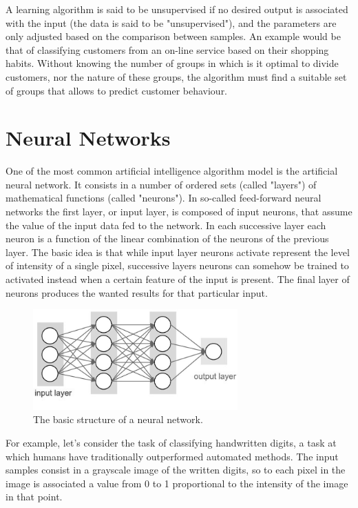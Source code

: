 \documentclass[a4paper]{report}
\begin{document}
A learning algorithm is said to be unsupervised if no desired output is associated with the input (the data is said to be "unsupervised"), and the parameters are only adjusted based on the comparison between samples.
An example would be that of classifying customers from an on-line service based on their shopping habits.
Without knowing the number of groups in which is it optimal to divide customers, nor the nature of these groups, the algorithm must find a suitable set of groups that allows to predict customer behaviour.

\section{Neural Networks}
One of the most common artificial intelligence algorithm model is the artificial neural network.
It consists in a number of ordered sets (called "layers") of mathematical functions (called "neurons").
In so-called feed-forward neural networks the first layer, or input layer, is composed of input neurons, that assume the value of the input data fed to the network.
In each successive layer each neuron is a function of the linear combination of the neurons of the previous layer.
The basic idea is that while input layer neurons activate represent the level of intensity of a single pixel, successive layers neurons can somehow be trained to activated instead when a certain feature of the input is present.
The final layer of neurons produces the wanted results for that particular input.
\begin{figure} [H]
\centering
\includegraphics [width=0.7\textwidth] {o/neuralnetwork.png}
\caption{The basic structure of a neural network.}
\end{figure}
For example, let's consider the task of classifying handwritten digits, a task at which humans have traditionally outperformed automated methods.
The input  samples consist in a grayscale image of the written digits, so to each pixel in the image is associated a value from 0 to 1 proportional to the intensity of the image in that point.
\end{document}
